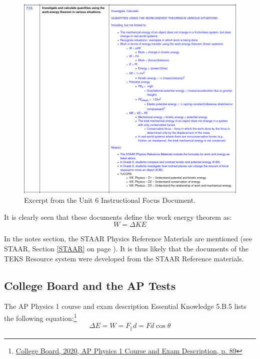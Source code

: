 \documentclass[letterpaper, 12pt]{article}
\begin{document}
\begin{figure}[H]
	\includegraphics[width=6in]{ifd.png}
\caption{Excerpt from the Unit 6 Instructional Focus Document.}	
\end{figure}

It is clearly seen that these documents define the work energy theorem as: 
\begin{equation}
	W = \Delta {KE}
\end{equation}
	
	In the notes section, the STAAR Physics Reference Materials are mentioned (see STAAR, Section \ref{STAAR} on page \pageref{STAAR}).   It is thus likely that the documents of the TEKS Resource system were developed from the STAAR Reference materials. 
	
	
\subsection{College Board and the AP Tests}

The AP Physics 1 course and exam description Essential Knowledge 5.B.5 lists the following equation:\footnote{\color{blue}\href{https://apcentral.collegeboard.org/pdf/ap-physics-1-course-and-exam-description.pdf?course=ap-physics-1-algebra-based}{College Board, 2020,  AP Physics 1 Course and Exam Description, p. 89}\color{black}}
\begin{equation}
	\Delta E = W = F_{\|} d = Fd\cos{\theta}
\end{equation}
\end{document}
